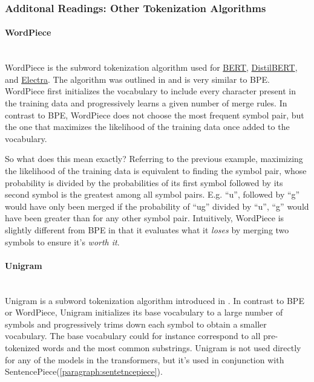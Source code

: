 \subsubsection{Additonal Readings: Other Tokenization Algorithms}
\paragraph{WordPiece}\mbox{}\\
WordPiece is the subword tokenization algorithm used for \href{https://huggingface.co/docs/transformers/main/en/model_doc/bert}{BERT}, \href{https://huggingface.co/docs/transformers/main/en/model_doc/distilbert}{DistilBERT}, and \href{https://huggingface.co/docs/transformers/main/en/model_doc/electra}{Electra}. The algorithm was outlined in \citep{Schuster2012JapaneseAK} and is very similar to
BPE. WordPiece first initializes the vocabulary to include every character present in the training data and progressively learns a given number of merge rules. In contrast to BPE, WordPiece does not choose the most frequent symbol pair, but the one that maximizes the likelihood of the training data once added to the vocabulary.

So what does this mean exactly? Referring to the previous example, maximizing the likelihood of the training data is equivalent to finding the symbol pair, whose probability is divided by the probabilities of its first symbol followed by its second symbol is the greatest among all symbol pairs. E.g. ``u'', followed by ``g'' would have only been merged if the probability of ``ug'' divided by ``u'', ``g'' would have been greater than for any other symbol pair. Intuitively, WordPiece is slightly different from BPE in that it evaluates what it \textit{loses} by merging two symbols to ensure it's \textit{worth it}.

\paragraph{Unigram}\mbox{}\\
Unigram is a subword tokenization algorithm introduced in \citep{kudo2018subword}. In contrast to BPE or WordPiece, Unigram initializes its base vocabulary to a large number of symbols and progressively trims down each symbol to obtain a smaller vocabulary. The base vocabulary could for instance correspond to all pre-tokenized words and the most common substrings. Unigram is not used directly for any of the models in the transformers, but it's used in conjunction with SentencePiece(\autoref{paragraph:sentetncepiece}).

